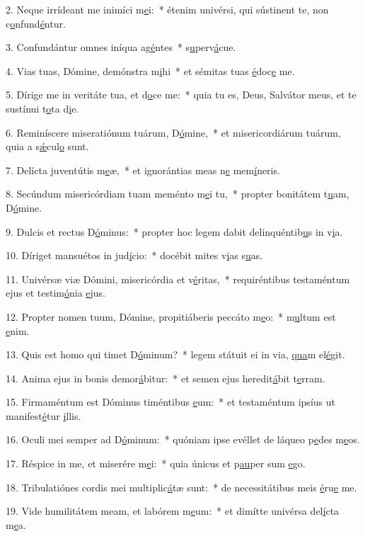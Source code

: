 2. Neque irrídeant me inimíci m\uline{e}i:~* étenim univérsi, qui sústinent te, non c\uline{o}nfund\uline{é}ntur.\par 
3. Confundántur omnes iníqua ag\uline{é}ntes~* s\uline{u}perv\uline{á}cue.\par 
4. Vias tuas, Dómine, demónstra m\uline{i}hi~* et sémitas tuas \uline{é}doc\uline{e} me.\par 
5. Dírige me in veritáte tua, et d\uline{o}ce me:~* quia tu es, Deus, Salvátor meus, et te sustínui t\uline{o}ta d\uline{i}e.\par 
6. Reminíscere miseratiónum tuárum, D\uline{ó}mine,~* et misericordiárum tuárum, quia a s\uline{ǽ}cul\uline{o} sunt.\par 
7. Delícta juventútis m\uline{e}æ,~* et ignorántias meas n\uline{e} mem\uline{í}neris.\par 
8. Secúndum misericórdiam tuam meménto m\uline{e}i tu,~* propter bonitátem t\uline{u}am, D\uline{ó}mine.\par 
9. Dulcis et rectus D\uline{ó}minus:~* propter hoc legem dabit delinquéntib\uline{u}s in v\uline{i}a.\par 
10. Díriget mansuétos in jud\uline{í}cio:~* docébit mites v\uline{i}as s\uline{u}as.\par 
11. Univérsæ viæ Dómini, misericórdia et v\uline{é}ritas,~* requiréntibus testaméntum ejus et testim\uline{ó}nia \uline{e}jus.\par 
12. Propter nomen tuum, Dómine, propitiáberis peccáto m\uline{e}o:~* m\uline{u}ltum est \uline{e}nim.\par 
13. Quis est homo qui timet D\uline{ó}minum?~* legem státuit ei in via, \uline{qua}m el\uline{é}git.\par 
14. Anima ejus in bonis demor\uline{á}bitur:~* et semen ejus heredit\uline{á}bit t\uline{e}rram.\par 
15. Firmaméntum est Dóminus timéntibus \uline{e}um:~* et testaméntum ipsíus ut manifest\uline{é}tur \uline{i}llis.\par 
16. Oculi mei semper ad D\uline{ó}minum:~* quóniam ipse evéllet de láqueo p\uline{e}des m\uline{e}os.\par 
17. Réspice in me, et miserére m\uline{e}i:~* quia únicus et p\uline{au}per sum \uline{e}go.\par 
18. Tribulatiónes cordis mei multiplic\uline{á}tæ sunt:~* de necessitátibus meis \uline{é}ru\uline{e} me.\par 
19. Vide humilitátem meam, et labórem m\uline{e}um:~* et dimítte univérsa del\uline{í}cta m\uline{e}a.\par 
